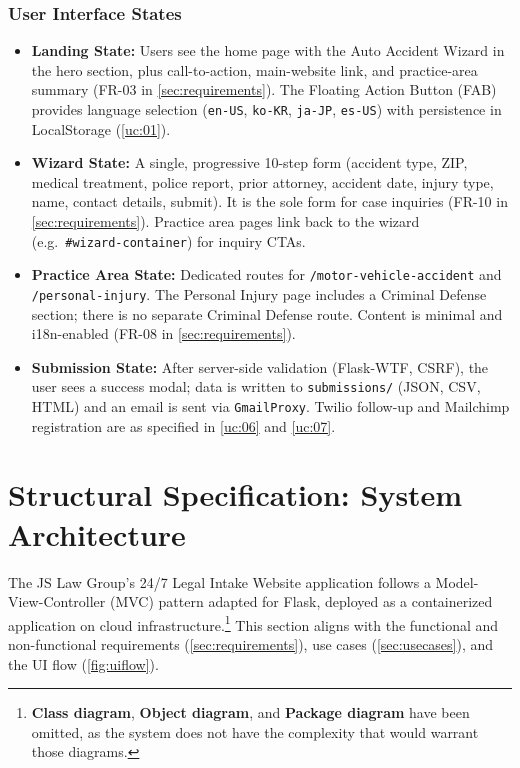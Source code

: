 \documentclass{article}
\begin{document}
\subsubsection{User Interface States}\label{ss:uistates}
\begin{itemize}
    \item \textbf{Landing State:} Users see the home page with the Auto Accident Wizard in 
    the hero section, plus call-to-action, main-website link, and practice-area summary 
    (FR-03 in \ref{sec:requirements}). The Floating Action Button (FAB) provides language 
    selection (\texttt{en-US}, \texttt{ko-KR}, \texttt{ja-JP}, \texttt{es-US}) with persistence 
    in LocalStorage (\ref{uc:01}).
    \item \textbf{Wizard State:} A single, progressive 10-step form 
    (accident type, ZIP, medical treatment, police report, prior attorney, accident date, 
    injury type, name, contact details, submit). It is the sole form for case inquiries 
    (FR-10 in \ref{sec:requirements}). Practice area pages link back to the wizard 
    (e.g.\ \texttt{\#wizard-container}) for inquiry CTAs.
    \item \textbf{Practice Area State:} Dedicated routes for \texttt{/motor-vehicle-accident} 
    and \texttt{/personal-injury}. The Personal Injury page includes a Criminal Defense section; 
    there is no separate Criminal Defense route. Content is minimal and i18n-enabled 
    (FR-08 in \ref{sec:requirements}).
    \item \textbf{Submission State:} After server-side validation (Flask-WTF, CSRF), 
    the user sees a success modal; data is written to \texttt{submissions/} (JSON, CSV, HTML) 
    and an email is sent via \texttt{GmailProxy}. Twilio follow-up and Mailchimp registration 
    are as specified in \ref{uc:06} and \ref{uc:07}.
\end{itemize}













\newpage
\section{Structural Specification: System Architecture}\label{sec:architecture}
The JS Law Group's 24/7 Legal Intake Website application follows a Model-View-Controller (MVC) 
pattern adapted for Flask, deployed as a containerized application on cloud infrastructure.\footnote{
  \textbf{Class diagram}, \textbf{Object diagram}, and \textbf{Package diagram} have been omitted, 
  as the system does not have the complexity that would warrant those diagrams.
}
This section aligns with the functional and non-functional requirements (\ref{sec:requirements}), use cases (\ref{sec:usecases}), 
and the UI flow (\ref{fig:uiflow}).
\end{document}
